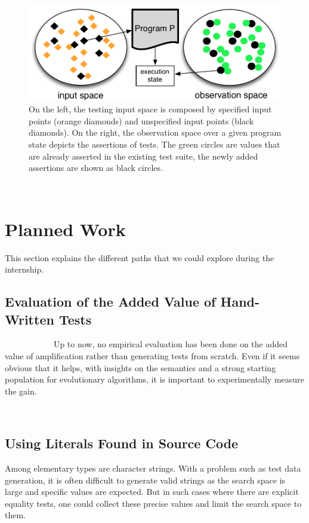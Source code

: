 \documentclass[11pt]{sdm}
\newcommand{\addref}[1]{\colorbox{TealBlue!100}{\textcolor{white}{\textbf{$[$\ifx&#1&\ \else#1\fi$]$}}}}
\newcommand{\todo}[1]{\colorbox{Red!75}{\textcolor{white}{\textbf{TODO\ifx&#1&\else: #1\fi}}}}
\begin{document}
\begin{figure}
  \centering
  \includegraphics[scale=0.5]{io-spaces.pdf}
  \caption{On the left, the testing input space is composed by specified input points (orange diamonds) and unspecified input points (black diamonds). On the right, the observation space over a given program state depicts the assertions of tests. The green circles are values that are already asserted in the existing test suite, the newly added assertions are shown as black circles.}
\label{fig:io-spaces}
\end{figure}

\cite{pawlak2016spoon}
\addref{new dspot paper}
\cite{baudry2015dspot} %


\section{Planned Work}
\label{planned}
This section explains the different paths that we could explore during the internship.

\subsection{Evaluation of the Added Value of Hand-Written Tests}
\label{evaluation}
\todo{}
Up to now, no empirical evaluation has been done on the added value of amplification rather than generating tests from scratch.
Even if it seems obvious that it helps, with insights on the semantics and a strong starting population for evolutionary algorithms, it is important to experimentally measure the gain.

\todo{what kind of experiments}

\subsection{Using Literals Found in Source Code}
\label{mutation}
Among elementary types are character strings.
With a problem such as test data generation, it is often difficult to generate valid strings as the search space is large and specific values are expected.
But in such cases where there are explicit equality tests, one could collect these precise values and limit the search space to them.
\end{document}
